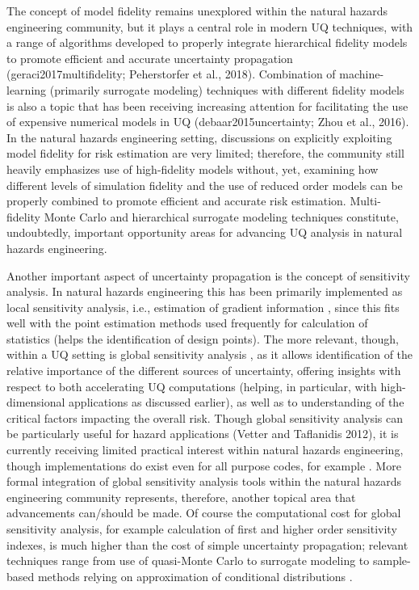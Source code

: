The concept of model fidelity remains unexplored within the natural hazards engineering community, but it plays a central role in modern UQ techniques, with a range of algorithms developed to properly integrate hierarchical fidelity models to promote efficient and accurate uncertainty propagation (geraci2017multifidelity; Peherstorfer et al., 2018). Combination of machine-learning (primarily surrogate modeling) techniques with different fidelity models is also a topic that has been receiving increasing attention for facilitating the use of expensive numerical models in UQ (debaar2015uncertainty; Zhou et al., 2016). In the natural hazards engineering setting, discussions on explicitly exploiting model fidelity for risk estimation are very limited; therefore, the community still heavily emphasizes use of high-fidelity models without, yet, examining how different levels of simulation fidelity and the use of reduced order models can be properly combined to promote efficient and accurate risk estimation. Multi-fidelity Monte Carlo and hierarchical surrogate modeling techniques constitute, undoubtedly, important opportunity areas for advancing UQ analysis in natural hazards engineering.

Another important aspect of uncertainty propagation is the concept of sensitivity analysis. In natural hazards engineering this has been primarily implemented as local sensitivity analysis, i.e., estimation of gradient information \citep{haukaas2007methods,gu2009finite},  since this fits well with the point estimation methods used frequently for calculation of statistics (helps the identification of design points). The more relevant, though, within a UQ setting is global sensitivity analysis \citep{sobol1990sensitivity,saltelli2002making,rahman2016fsensitivity}, as it allows identification of the relative importance of the different sources of uncertainty, offering insights with respect to both accelerating UQ computations (helping, in particular, with high-dimensional applications as discussed earlier), as well as to understanding of the critical factors impacting the overall risk. Though global sensitivity analysis can be particularly useful for hazard applications (Vetter and Taflanidis 2012), it is currently receiving limited practical interest within natural hazards engineering, though implementations do exist even for all purpose codes, for example \citep{bourinet2009review}. More formal integration of global sensitivity analysis tools within the natural hazards engineering community represents, therefore, another topical area that advancements can/should be made. Of course the computational cost for global sensitivity analysis, for example calculation of first and higher order sensitivity indexes, is much higher than the cost of simple uncertainty propagation; relevant techniques range from use of quasi-Monte Carlo \citep{saltelli2002making} to surrogate modeling \citep{sudret2008global} to sample-based methods relying on approximation of conditional distributions \citep{li2016efficient,hu2019probability}.  

